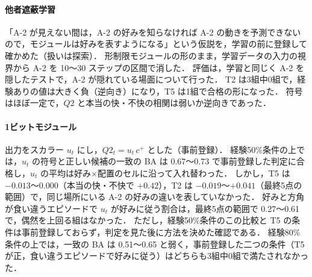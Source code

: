 \paragraph{他者遮蔽学習}
「A-2 が見えない間は，A-2 の好みを知らなければ A-2 の動きを予測できないので，モジュールは好みを表すようになる」という仮説を，学習の前に登録して確かめた（扱いは探索）．
形制限モジュールの形のまま，学習データの入力の視界から A-2 を 10〜30 ステップの区間で消した．
評価は，学習と同じく A-2 を隠したテストで，A-2 が隠れている場面について行った．
T2 は3組中0組で，経験ありの値は大きく負（逆向き）になり，T5 は1組で合格の形になった．
符号はほぼ一定で，$Q2$ と本当の快・不快の相関は弱いか逆向きであった．

\paragraph{1ビットモジュール}
出力をスカラー $u_t$ にし，$Q2_t=u_t\,c^{+}$ とした（事前登録）．
経験50\%条件の上では，$u_t$ の符号と正しい候補の一致の BA は 0.67〜0.73 で事前登録した判定に合格し，$u_t$ の平均は好み×配置のセルに沿って入れ替わった．
しかし，T5 は $-0.013$〜$0.000$（本当の快・不快で $+0.42$），T2 は $-0.019$〜$+0.041$（最終5点の範囲）で，同じ場所にいる A-2 の好みの違いを表していなかった．
好みと方角が食い違うエピソードで $u_t$ が好みに従う割合は，最終5点の範囲で 0.27〜0.61 で，偶然を上回る組はなかった．
ただし，経験50\%条件のこの比較と T5 の条件は事前登録しておらず，判定を見た後に方法を決めた確認である．
経験80\%条件の上では，一致の BA は 0.51〜0.65 と弱く，事前登録した二つの条件（T5 が正，食い違うエピソードで好みに従う）はどちらも3組中0組で満たされなかった．

